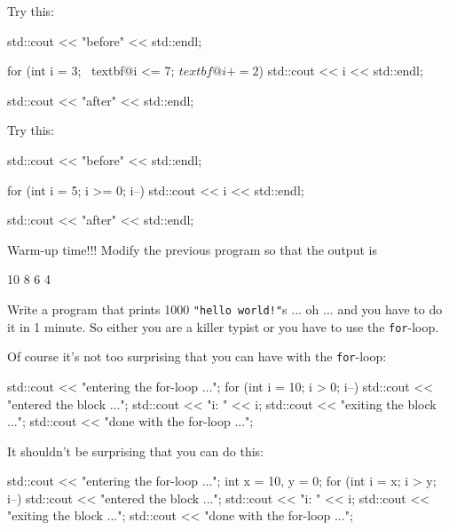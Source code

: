 Try this:
\begin{console}[commandchars=\~\@\$]
std::cout << "before" << std::endl;

for (int i = 3; ~textbf@i <= 7$; ~textbf@i += 2$)
    std::cout << i << std::endl;

std::cout << "after" << std::endl;
\end{console}


Try this:
\begin{console}[commandchars=\~\@\$]
std::cout << "before" << std::endl;

for (int i = 5; i >= 0; i--)
    std::cout << i << std::endl;
    
std::cout << "after" << std::endl;
\end{console}


\begin{ex}
Warm-up time!!! Modify the previous program so that the output
is
\begin{console}
10
8
6
4
\end{console}
\end{ex}

\begin{ex}
 Write a program that prints 1000 \texttt{"hello
world!"}s ... oh ... and you have to do it in 1 minute. So either you
are a killer typist or you have to use the \texttt{for}-loop.
\end{ex}

\newpage{}

Of course it's not too surprising that you can have  with the \texttt{for}-loop:
\begin{console}
std::cout << "entering the for-loop ...\n";
for (int i = 10; i > 0; i--)
{
        std::cout << "entered the block ...\n";
        std::cout << "i: " << i;
        std::cout << "exiting the block ...\n";
}
std::cout << "done with the for-loop ...\n";
\end{console}

It shouldn't be surprising that you can do this:
\begin{console}
std::cout << "entering the for-loop ...\n";
int x = 10, y = 0;
for (int i = x; i > y; i--)
{
        std::cout << "entered the block ...\n";
        std::cout << "i: " << i;
        std::cout << "exiting the block ...\n";
}
std::cout << "done with the for-loop ...\n";
\end{console}

